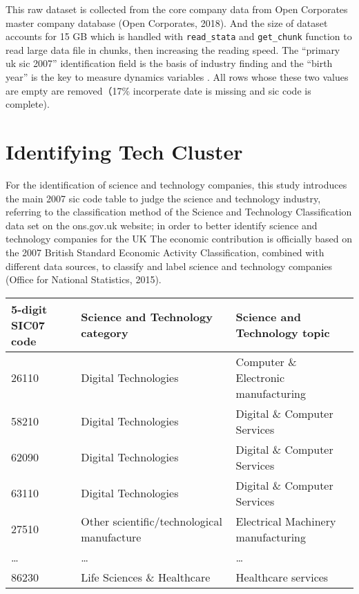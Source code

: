 \documentclass[
  12pt,
  oneside]{book}
\begin{document}
This raw dataset is collected from the core company data from Open Corporates master company database (Open Corporates, 2018). And the size of dataset accounts for 15 GB which is handled with \texttt{read\_stata} and \texttt{get\_chunk} function to read large data file in chunks, then increasing the reading speed. The ``primary uk sic 2007'' identification field is the basis of industry finding and the ``birth year'' is the key to measure dynamics variables . All rows whose these two values are empty are removed（17\% incorperate date is missing and sic code is complete).

\hypertarget{identifying-tech-cluster}{%
\section{Identifying Tech Cluster}\label{identifying-tech-cluster}}

For the identification of science and technology companies, this study introduces the main 2007 sic code table to judge the science and technology industry, referring to the classification method of the Science and Technology Classification data set on the ons.gov.uk website; in order to better identify science and technology companies for the UK The economic contribution is officially based on the 2007 British Standard Economic Activity Classification, combined with different data sources, to classify and label science and technology companies (Office for National Statistics, 2015).

\begin{table}
\centering
\begin{tabular}{lll}
\toprule
\textbf{5-digit SIC07 code} & \textbf{Science and Technology category} & \textbf{Science and Technology topic}\\
\midrule
26110 & Digital Technologies & Computer \& Electronic manufacturing\\
58210 & Digital Technologies & Digital \& Computer Services\\
62090 & Digital Technologies & Digital \& Computer Services\\
63110 & Digital Technologies & Digital \& Computer Services\\
27510 & Other scientific/technological manufacture & Electrical Machinery manufacturing\\
\addlinespace
… & … & …\\
86230 & Life Sciences \& Healthcare & Healthcare services\\
\bottomrule
\end{tabular}
\end{table}
\end{document}
